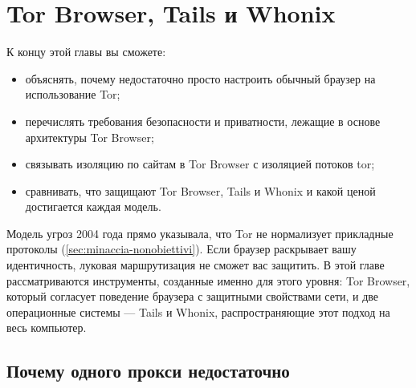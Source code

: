 \chapter{Tor Browser, Tails и Whonix}\label{cap:23-browser}

\begin{obiettivi}
К концу этой главы вы сможете:
\begin{itemize}[nosep]
  \item объяснять, почему недостаточно просто настроить обычный браузер на использование Tor;
  \item перечислять требования безопасности и приватности, лежащие в основе архитектуры Tor Browser;
  \item связывать изоляцию по сайтам в Tor Browser с изоляцией потоков tor;
  \item сравнивать, что защищают Tor Browser, Tails и Whonix и какой ценой достигается каждая модель.
\end{itemize}
\end{obiettivi}

Модель угроз 2004 года прямо указывала, что Tor не нормализует прикладные протоколы (\cref{sec:minaccia-nonobiettivi}). Если браузер раскрывает вашу идентичность, луковая маршрутизация не сможет вас защитить. В этой главе рассматриваются инструменты, созданные именно для этого уровня: Tor Browser, который согласует поведение браузера с защитными свойствами сети, и две операционные системы — Tails и Whonix, распространяющие этот подход на весь компьютер.

\section{Почему одного прокси недостаточно}\label{sec:browser-proxy}

